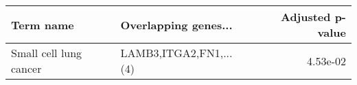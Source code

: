 \begin{tabular}{llr}
\toprule
             Term name &   Overlapping genes... &  Adjusted p-value \\
\midrule
Small cell lung cancer & LAMB3,ITGA2,FN1,...(4) &          4.53e-02 \\
\bottomrule
\end{tabular}
